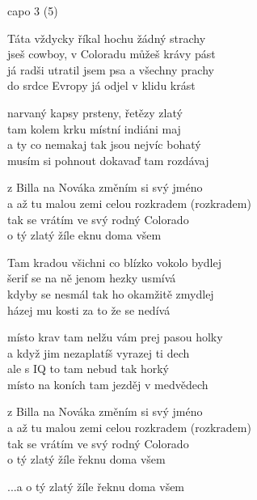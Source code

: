\re{}
capo 3 (5)

\ve{}
Táta vždycky říkal hochu žádný strachy\\
jseš cowboy, v Coloradu můžeš krávy pást\\
já radši utratil jsem psa a všechny prachy\\
do srdce Evropy já odjel v klidu krást

\ve{}

narvaný kapsy prsteny, řetězy zlatý\\
tam kolem krku místní indiáni maj\\
a ty co nemakaj tak jsou nejvíc bohatý\\
musím si pohnout dokavaď tam rozdávaj

\cho{}
z Billa na Nováka změním si svý jméno\\
a až tu malou zemi celou rozkradem (rozkradem)\\
tak se vrátím ve svý rodný Colorado\\
o tý zlatý žíle eknu doma všem
\ve{}

Tam kradou všichni co blízko vokolo bydlej\\
šerif se na ně jenom hezky usmívá\\
kdyby se nesmál tak ho okamžitě zmydlej\\
házej mu kosti za to že se nedívá
\ve{}

místo krav tam nelžu vám prej pasou holky\\
a když jim nezaplatíš vyrazej ti dech\\
ale s IQ to tam nebud tak horký\\
místo na koních tam jezděj v medvědech
\ve{}

z Billa na Nováka změním si svý jméno\\
a až tu malou zemi celou rozkradem (rozkradem)\\
tak se vrátím ve svý rodný Colorado\\
o tý zlatý žíle řeknu doma všem

\cho{} ...a o tý zlatý žíle řeknu doma všem

\esong